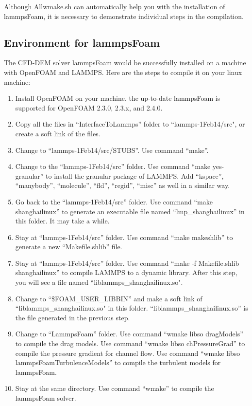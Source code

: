 \documentclass[11pt]{article}
\begin{document}
Although Allwmake.sh can automatically help you with the installation of lammpsFoam, it is necessary
to demonstrate individual steps in the compilation.

\subsection{Environment for lammpsFoam}
The CFD-DEM solver lammpsFoam would be successfully installed on a machine with OpenFOAM and LAMMPS.
Here are the steps to compile it on your linux machine:
\begin{enumerate}
    \item Install OpenFOAM on your machine, the up-to-date lammpsFoam is supported for OpenFOAM
        2.3.0, 2.3.x, and 2.4.0.
    \item Copy all the files in ``InterfaceToLammps'' folder to ``lammps-1Feb14/src", or create a
        soft link of the files.
    \item Change to ``lammps-1Feb14/src/STUBS''. Use command ``make''.
    \item Change to the ``lammps-1Feb14/src'' folder. Use command ``make yes-granular'' to install
        the granular package of LAMMPS. Add ``kspace'', ``manybody'', ``molecule'', ``fld'',
        ``regid'', ``misc'' as well
        in a similar way.
    \item Go back to the ``lammps-1Feb14/src'' folder. Use command ``make shanghailinux'' to
        generate an executable file named ``lmp\_shanghailinux'' in this folder. It may take a
        while.
    \item Stay at ``lammps-1Feb14/src'' folder. Use command ``make makeshlib'' to generate a new
        ``Makefile.shlib'' file.
    \item Stay at ``lammps-1Feb14/src'' folder. Use command ``make -f Makefile.shlib shanghailinux''
        to compile LAMMPS to a dynamic library. After this step, you will see a file named
        ``liblammps\_shanghailinux.so".
    \item Change to ``\$FOAM\_USER\_LIBBIN'' and make a soft link of ``liblammps\_shanghailinux.so"
        in this folder. ``liblammps\_shanghailinux.so'' is the file generated in the previous step.
    \item Change to ``LammpsFoam'' folder. Use command ``wmake libso dragModels'' to compile the
        drag models. Use command ``wmake libso chPressureGrad'' to compile the pressure gradient for
        channel flow. Use command ``wmake libso lammpsFoamTurbulenceModels'' to compile the
        turbulent models for lammpsFoam.
    \item Stay at the same directory. Use command ``wmake'' to compile the lammpsFoam solver.
\end{enumerate}
\end{document}
